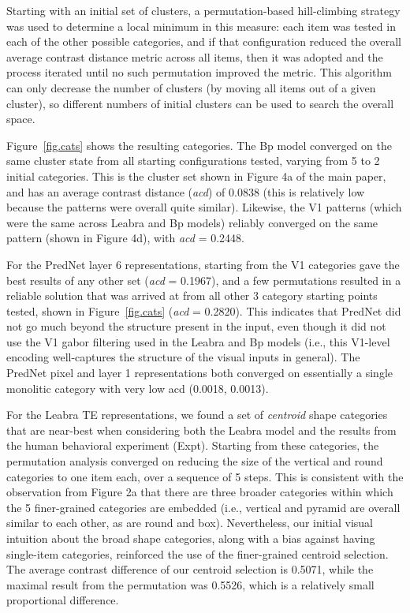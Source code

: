 \documentclass[12pt,twoside]{naturefigs}
\newif\myifpdf
\begin{document}
Starting with an initial set of clusters, a permutation-based hill-climbing strategy was used to determine a local minimum in this measure: each item was tested in each of the other possible categories, and if that configuration reduced the overall average contrast distance metric across all items, then it was adopted and the process iterated until no such permutation improved the metric.  This algorithm can only decrease the number of clusters (by moving all items out of a given cluster), so different numbers of initial clusters can be used to search the overall space.

Figure~\ref{fig.cats} shows the resulting categories. The Bp model converged on the same cluster state from all starting configurations tested, varying from 5 to 2 initial categories.  This is the cluster set shown in Figure 4a of the main paper, and has an average contrast distance ({\em acd}) of 0.0838 (this is relatively low because the patterns were overall quite similar).  Likewise, the V1 patterns (which were the same across Leabra and Bp models) reliably converged on the same pattern (shown in Figure 4d), with {\em acd} = 0.2448.

For the PredNet layer 6 representations, starting from the V1 categories gave the best results of any other set ({\em acd} = 0.1967), and a few permutations resulted in a reliable solution that was arrived at from all other 3 category starting points tested, shown in Figure~\ref{fig.cats} ({\em acd} = 0.2820).  This indicates that PredNet did not go much beyond the structure present in the input, even though it did not use the V1 gabor filtering used in the Leabra and Bp models (i.e., this V1-level encoding well-captures the structure of the visual inputs in general).  The PredNet pixel and layer 1 representations both converged on essentially a single monolitic category with very low acd (0.0018, 0.0013).

For the Leabra TE representations, we found a set of {\em centroid} shape categories that are near-best when considering both the Leabra model and the results from the human behavioral experiment (Expt).  Starting from these  categories, the permutation analysis converged on reducing the size of the vertical and round categories to one item each, over a sequence of 5 steps.  This is consistent with the observation from Figure 2a that there are three broader categories within which the 5 finer-grained categories are embedded (i.e., vertical and pyramid are overall similar to each other, as are round and box).  Nevertheless, our initial visual intuition about the broad shape categories, along with a bias against having single-item categories, reinforced the use of the finer-grained centroid selection.  The average contrast difference of our centroid selection is 0.5071, while the maximal result from the permutation was 0.5526, which is a relatively small proportional difference.
\end{document}
